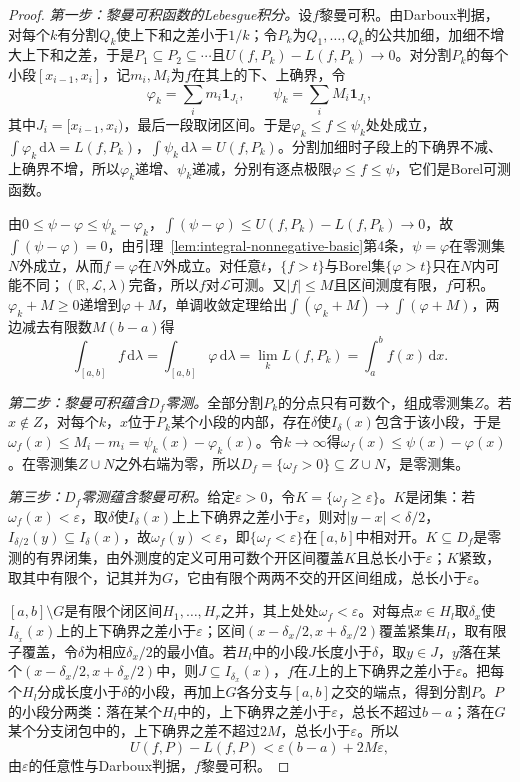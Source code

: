 \begin{proof}
\emph{第一步：黎曼可积函数的Lebesgue积分。}设$f$黎曼可积。由Darboux判据，对每个$k$有分割$Q_k$使上下和之差小于$1/k$；令$P_k$为$Q_1,\dots,Q_k$的公共加细，加细不增大上下和之差，于是$P_1\subseteq P_2\subseteq\cdots$且$U(f,P_k)-L(f,P_k)\to0$。对分割$P_k$的每个小段$[x_{i-1},x_i]$，记$m_i,M_i$为$f$在其上的下、上确界，令
\[
 \varphi_k=\sum_im_i\mathbf 1_{J_i},\qquad\psi_k=\sum_iM_i\mathbf 1_{J_i},
\]
其中$J_i=[x_{i-1},x_i)$，最后一段取闭区间。于是$\varphi_k\le f\le\psi_k$处处成立，$\int\varphi_k\,\mathrm d\lambda=L(f,P_k)$，$\int\psi_k\,\mathrm d\lambda=U(f,P_k)$。分割加细时子段上的下确界不减、上确界不增，所以$\varphi_k$递增、$\psi_k$递减，分别有逐点极限$\varphi\le f\le\psi$，它们是Borel可测函数。

由$0\le\psi-\varphi\le\psi_k-\varphi_k$，$\int(\psi-\varphi)\le U(f,P_k)-L(f,P_k)\to0$，故$\int(\psi-\varphi)=0$，由引理~\ref{lem:integral-nonnegative-basic}第4条，$\psi=\varphi$在零测集$N$外成立，从而$f=\varphi$在$N$外成立。对任意$t$，$\{f>t\}$与Borel集$\{\varphi>t\}$只在$N$内可能不同；$(\mathbb R,\mathcal L,\lambda)$完备，所以$f$对$\mathcal L$可测。又$|f|\le M$且区间测度有限，$f$可积。$\varphi_k+M\ge0$递增到$\varphi+M$，单调收敛定理给出$\int(\varphi_k+M)\to\int(\varphi+M)$，两边减去有限数$M(b-a)$得
\[
 \int_{[a,b]}f\,\mathrm d\lambda=\int_{[a,b]}\varphi\,\mathrm d\lambda=\lim_kL(f,P_k)=\int_a^bf(x)\,\mathrm dx.
\]

\emph{第二步：黎曼可积蕴含$D_f$零测。}全部分割$P_k$的分点只有可数个，组成零测集$Z$。若$x\notin Z$，对每个$k$，$x$位于$P_k$某个小段的内部，存在$\delta$使$I_\delta(x)$包含于该小段，于是$\omega_f(x)\le M_i-m_i=\psi_k(x)-\varphi_k(x)$。令$k\to\infty$得$\omega_f(x)\le\psi(x)-\varphi(x)$。在零测集$Z\cup N$之外右端为零，所以$D_f=\{\omega_f>0\}\subseteq Z\cup N$，是零测集。

\emph{第三步：$D_f$零测蕴含黎曼可积。}给定$\varepsilon>0$，令$K=\{\omega_f\ge\varepsilon\}$。$K$是闭集：若$\omega_f(x)<\varepsilon$，取$\delta$使$I_\delta(x)$上上下确界之差小于$\varepsilon$，则对$|y-x|<\delta/2$，$I_{\delta/2}(y)\subseteq I_\delta(x)$，故$\omega_f(y)<\varepsilon$，即$\{\omega_f<\varepsilon\}$在$[a,b]$中相对开。$K\subseteq D_f$是零测的有界闭集，由外测度的定义可用可数个开区间覆盖$K$且总长小于$\varepsilon$；$K$紧致，取其中有限个，记其并为$G$，它由有限个两两不交的开区间组成，总长小于$\varepsilon$。

$[a,b]\setminus G$是有限个闭区间$H_1,\dots,H_r$之并，其上处处$\omega_f<\varepsilon$。对每点$x\in H_l$取$\delta_x$使$I_{\delta_x}(x)$上的上下确界之差小于$\varepsilon$；区间$(x-\delta_x/2,x+\delta_x/2)$覆盖紧集$H_l$，取有限子覆盖，令$\delta$为相应$\delta_x/2$的最小值。若$H_l$中的小段$J$长度小于$\delta$，取$y\in J$，$y$落在某个$(x-\delta_x/2,x+\delta_x/2)$中，则$J\subseteq I_{\delta_x}(x)$，$f$在$J$上的上下确界之差小于$\varepsilon$。把每个$H_l$分成长度小于$\delta$的小段，再加上$G$各分支与$[a,b]$之交的端点，得到分割$P$。$P$的小段分两类：落在某个$H_l$中的，上下确界之差小于$\varepsilon$，总长不超过$b-a$；落在$G$某个分支闭包中的，上下确界之差不超过$2M$，总长小于$\varepsilon$。所以
\[
 U(f,P)-L(f,P)<\varepsilon(b-a)+2M\varepsilon,
\]
由$\varepsilon$的任意性与Darboux判据，$f$黎曼可积。
\end{proof}

